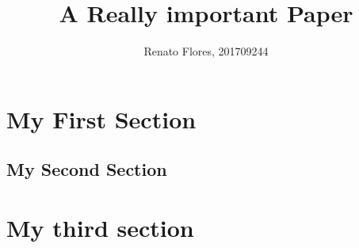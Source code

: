 \documentclass[titlepage]{article} %
\author{Renato Flores, 201709244}
\title{A Really important Paper}
\begin{document}
\maketitle
\tableofcontents
\clearpage
    \section{My First Section}
		\blindtext
    \subsection{My Second Section}
    	\blindtext
    \section{My third section}
    	\blindtext
    
\end{document}
